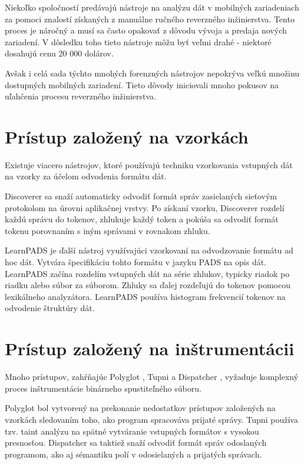 Niekoľko spoločností predávajú nástroje na analýzu dát v mobilných zariadeniach za pomoci znalostí získaných z manuálne ručného reverzného inžinierstva. Tento proces je náročný a musí sa často opakovať z dôvodu vývoja a predaja nových zariadení. V dôsledku toho tieto nástroje
môžu byť veľmi drahé - niektoré dosahujú cenu 20 000 dolárov. 

Avšak i celá sada týchto mnohých forenzných nástrojov nepokrýva veľkú množinu dostupných mobilných zariadení. Tieto dôvody iniciovali mnoho pokusov na uľahčenia procesu reverzného inžinierstva.

\section{Prístup založený na vzorkách}

Existuje viacero nástrojov, ktoré používajú techniku vzorkovania vstupných dát na vzorky za účelom odvodenia formátu dát.

Discoverer \cite{Cui:2007:DAP:1362903.1362917} sa snaží automaticky odvodiť formát správ zasielaných sieťovým protokolom na úrovni aplikačnej vrstvy. Po získaní vzorku, Discoverer rozdelí každú správu do tokenov, zhlukuje každý token a pokúša sa odvodiť formát tokenu porovnaním s iným správami v rovnakom zhluku.

LearnPADS \cite{Fisher:2008:DSF:1328897.1328488} je ďalší nástroj využívajúci vzorkovaní na odvodzovanie formátu ad hoc dát. Vytvára špecifikáciu tohto formátu v jazyku PADS na opis dát.  LearnPADS začína rozdelím vstupných dát na série zhlukov, typicky riadok po riadku alebo súbor za súborom. Zhluky sa ďalej rozdeľujú do tokenov pomocou lexikálneho analyzátora. LearnPADS používa histogram frekvencií tokenov na odvodenie štruktúry dát.

\section{Prístup založený na inštrumentácii}

Mnoho prístupov, zahŕňajúc Polyglot \cite{Caballero:2007:PAE:1315245.1315286}, Tupni \cite{Cui:2008:TAR:1455770.1455820} a Dispatcher \cite{Caballero:2009:DEA:1653662.1653737}, vyžaduje komplexný proces inštrumentácie binárneho spustiteľného súboru.

Polyglot bol vytvorený na prekonanie nedostatkov prístupov založených na vzorkách
sledovaním toho, ako program spracováva prijaté správy. Tupni používa tzv. taint analýzu na spätné vytváranie vstupných formátov s vysokou presnosťou. Dispatcher sa taktiež snaží odvodiť formát správ odoslaných programom, ako aj sémantiku polí v odosielaných a prijatých správach.

